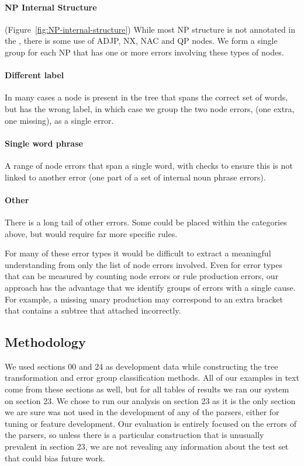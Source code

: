 \paragraph{NP Internal Structure} (Figure~\ref{fig:NP-internal-structure}) 
While most NP structure is not annotated in the \ptb, there is some use of ADJP, NX, NAC and QP nodes.
We form a single group for each NP that has one or more errors involving these types of nodes.

\paragraph{Different label}
In many cases a node is present in the tree that spans the correct set of words, but has the wrong label, in which case we group the two node errors, (one extra, one missing), as a single error.

\paragraph{Single word phrase}
A range of node errors that span a single word, with checks to ensure this is not linked to another error (\myeg one part of a set of internal noun phrase errors).

\paragraph{Other}
There is a long tail of other errors.
Some could be placed within the categories above, but would require far more specific rules.

For many of these error types it would be difficult to extract a meaningful understanding from only the list of node errors involved.
Even for error types that can be measured by counting node errors or rule production errors, our approach has the advantage that we identify groups of errors with a single cause.
For example, a missing unary production may correspond to an extra bracket that contains a subtree that attached incorrectly.

\subsection{Methodology}

We used sections 00 and 24 as development data while constructing the tree transformation and error group classification methods.
All of our examples in text come from these sections as well, but for all tables of results we ran our system on section 23.
We chose to run our analysis on section 23 as it is the only section we are sure was not used in the development of any of the parsers, either for tuning or feature development.
Our evaluation is entirely focused on the errors of the parsers, so unless there is a particular construction that is unusually prevalent in section 23, we are not revealing any information about the test set that could bias future work.

